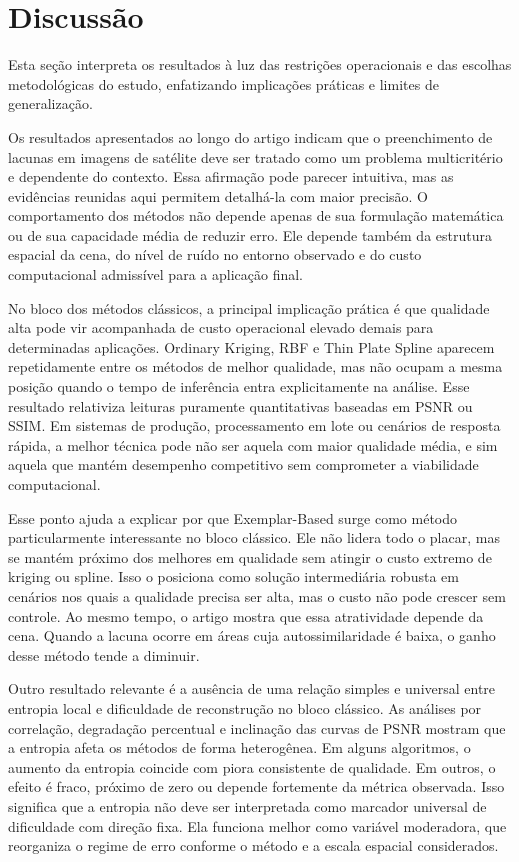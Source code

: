 \section{Discussão}
\label{sec:discussion}

Esta seção interpreta os resultados à luz das restrições operacionais e das escolhas metodológicas do estudo, enfatizando implicações práticas e limites de generalização.

Os resultados apresentados ao longo do artigo indicam que o preenchimento de lacunas em imagens de satélite deve ser tratado como um problema multicritério e dependente do contexto.
Essa afirmação pode parecer intuitiva, mas as evidências reunidas aqui permitem detalhá-la com maior precisão.
O comportamento dos métodos não depende apenas de sua formulação matemática ou de sua capacidade média de reduzir erro.
Ele depende também da estrutura espacial da cena, do nível de ruído no entorno observado e do custo computacional admissível para a aplicação final.

No bloco dos métodos clássicos, a principal implicação prática é que qualidade alta pode vir acompanhada de custo operacional elevado demais para determinadas aplicações.
Ordinary Kriging, \gls{RBF} e Thin Plate Spline aparecem repetidamente entre os métodos de melhor qualidade, mas não ocupam a mesma posição quando o tempo de inferência entra explicitamente na análise.
Esse resultado relativiza leituras puramente quantitativas baseadas em \gls{PSNR} ou \gls{SSIM}.
Em sistemas de produção, processamento em lote ou cenários de resposta rápida, a melhor técnica pode não ser aquela com maior qualidade média, e sim aquela que mantém desempenho competitivo sem comprometer a viabilidade computacional.

Esse ponto ajuda a explicar por que Exemplar-Based surge como método particularmente interessante no bloco clássico.
Ele não lidera todo o placar, mas se mantém próximo dos melhores em qualidade sem atingir o custo extremo de kriging ou spline.
Isso o posiciona como solução intermediária robusta em cenários nos quais a qualidade precisa ser alta, mas o custo não pode crescer sem controle.
Ao mesmo tempo, o artigo mostra que essa atratividade depende da cena.
Quando a lacuna ocorre em áreas cuja autossimilaridade é baixa, o ganho desse método tende a diminuir.

Outro resultado relevante é a ausência de uma relação simples e universal entre entropia local e dificuldade de reconstrução no bloco clássico.
As análises por correlação, degradação percentual e inclinação das curvas de \gls{PSNR} mostram que a entropia afeta os métodos de forma heterogênea.
Em alguns algoritmos, o aumento da entropia coincide com piora consistente de qualidade.
Em outros, o efeito é fraco, próximo de zero ou depende fortemente da métrica observada.
Isso significa que a entropia não deve ser interpretada como marcador universal de dificuldade com direção fixa.
Ela funciona melhor como variável moderadora, que reorganiza o regime de erro conforme o método e a escala espacial considerados.

